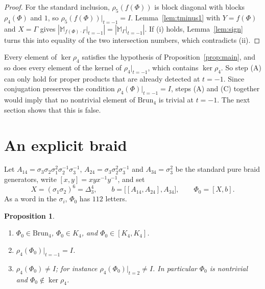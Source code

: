 \documentclass[11pt]{amsart}
\newtheorem{proposition}[lemma]{Proposition}
\theoremstyle{remark}
\newcommand{\M}{\mathbb{M}}
\newcommand{\Brun}{\mathrm{Brun}}
\newcommand{\at}{\big|_{t=-1}}
\begin{document}
\begin{proof}
For the standard inclusion, $\rho_5(f(\Phi))$ is block diagonal with blocks $\rho_4(\Phi)$ and $1$, so $\rho_5(f(\Phi))\at=I$. Lemma~\ref{lem:tminus1} with $Y=f(\Phi)$ and $X=\Gamma$ gives $|\M_{f(\Phi)\cdot\Gamma}\at|=|\M_\Gamma\at|$. If (i) holds, Lemma~\ref{lem:sign} turns this into equality of the two intersection numbers, which contradicts (ii).
\end{proof}

Every element of $\ker\rho_4$ satisfies the hypothesis of Proposition~\ref{prop:main}, and so does every element of the kernel of $\rho_4\at$, which contains $\ker\rho_4$. So step (A) can only hold for proper products that are already detected at $t=-1$. Since conjugation preserves the condition $\rho_4(\Phi)\at=I$, steps (A) and (C) together would imply that no nontrivial element of $\Brun_4$ is trivial at $t=-1$. The next section shows that this is false.

\section{An explicit braid}

Let $A_{14}=\sigma_3\sigma_2\sigma_1^2\sigma_2^{-1}\sigma_3^{-1}$, $A_{24}=\sigma_3\sigma_2^2\sigma_3^{-1}$ and $A_{34}=\sigma_3^2$ be the standard pure braid generators, write $[x,y]=xyx^{-1}y^{-1}$, and set
\[
X=(\sigma_1\sigma_2)^6=\Delta_3^4,\qquad b=\bigl[[A_{14},A_{24}],A_{34}\bigr],\qquad \Phi_0=[X,b].
\]
As a word in the $\sigma_i$, $\Phi_0$ has $112$ letters.

\begin{proposition}\label{prop:phi0}
\begin{enumerate}
\item[(a)] $\Phi_0\in\Brun_4$, $\Phi_0\in K_4$, and $\Phi_0\in[K_4,K_4]$.
\item[(b)] $\rho_4(\Phi_0)\at=I$.
\item[(c)] $\rho_4(\Phi_0)\neq I$; for instance $\rho_4(\Phi_0)|_{t=2}\neq I$. In particular $\Phi_0$ is nontrivial and $\Phi_0\notin\ker\rho_4$.
\end{enumerate}
\end{proposition}
\end{document}
